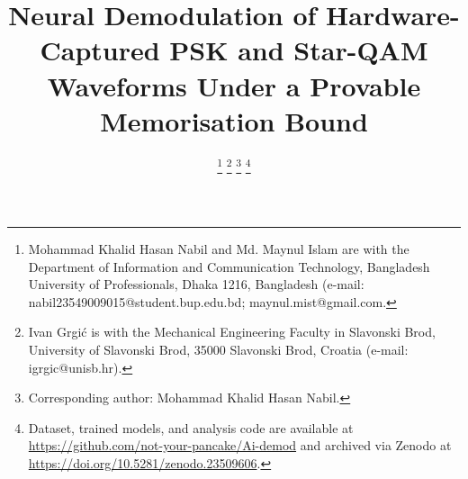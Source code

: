 \documentclass[journal]{IEEEtran}   %
\begin{document}
\title{Neural Demodulation of Hardware-Captured PSK and Star-QAM Waveforms
Under a Provable Memorisation Bound}

\author{
  \thanks{Mohammad Khalid Hasan Nabil and Md. Maynul Islam are with the Department of Information and Communication Technology, Bangladesh University of Professionals, Dhaka 1216, Bangladesh (e-mail: nabil23549009015@student.bup.edu.bd; maynul.mist@gmail.com.}%
  \thanks{Ivan Grgić is with the Mechanical Engineering Faculty in Slavonski Brod, University of Slavonski Brod, 35000 Slavonski Brod, Croatia (e-mail: igrgic@unisb.hr).}%
  \thanks{Corresponding author: Mohammad Khalid Hasan Nabil.}%
\thanks{Dataset, trained models, and analysis code are available at \url{https://github.com/not-your-pancake/Ai-demod} and archived via Zenodo at \url{https://doi.org/10.5281/zenodo.23509606}.}
}


\maketitle
\end{document}
